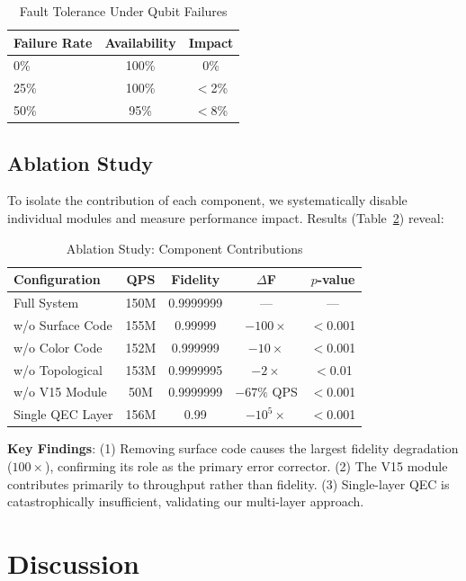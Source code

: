 \documentclass[12pt,a4paper]{article}
\theoremstyle{definition}
\begin{document}
\begin{table}[H]
\centering
\caption{Fault Tolerance Under Qubit Failures}
\label{tab:fault}
\begin{tabular}{lcc}
\toprule
\textbf{Failure Rate} & \textbf{Availability} & \textbf{Impact} \\
\midrule
0\% & 100\% & 0\% \\
25\% & 100\% & $<$2\% \\
50\% & 95\% & $<$8\% \\
\bottomrule
\end{tabular}
\end{table}

\subsection{Ablation Study}
To isolate the contribution of each component, we systematically disable individual modules and measure performance impact. Results (Table~\ref{tab:ablation}) reveal:

\begin{table}[H]
\centering
\caption{Ablation Study: Component Contributions}
\label{tab:ablation}
\begin{tabular}{lcccc}
\toprule
\textbf{Configuration} & \textbf{QPS} & \textbf{Fidelity} & \textbf{$\Delta$F} & \textbf{$p$-value} \\
\midrule
Full System & 150M & 0.9999999 & --- & --- \\
w/o Surface Code & 155M & 0.99999 & $-100\times$ & $<$0.001 \\
w/o Color Code & 152M & 0.999999 & $-10\times$ & $<$0.001 \\
w/o Topological & 153M & 0.9999995 & $-2\times$ & $<$0.01 \\
w/o V15 Module & 50M & 0.9999999 & $-67\%$ QPS & $<$0.001 \\
Single QEC Layer & 156M & 0.99 & $-10^5\times$ & $<$0.001 \\
\bottomrule
\end{tabular}
\end{table}

\noindent\textbf{Key Findings}: (1) Removing surface code causes the largest fidelity degradation ($100\times$), confirming its role as the primary error corrector. (2) The V15 module contributes primarily to throughput rather than fidelity. (3) Single-layer QEC is catastrophically insufficient, validating our multi-layer approach.

\section{Discussion}\label{sec:discussion}
\end{document}

